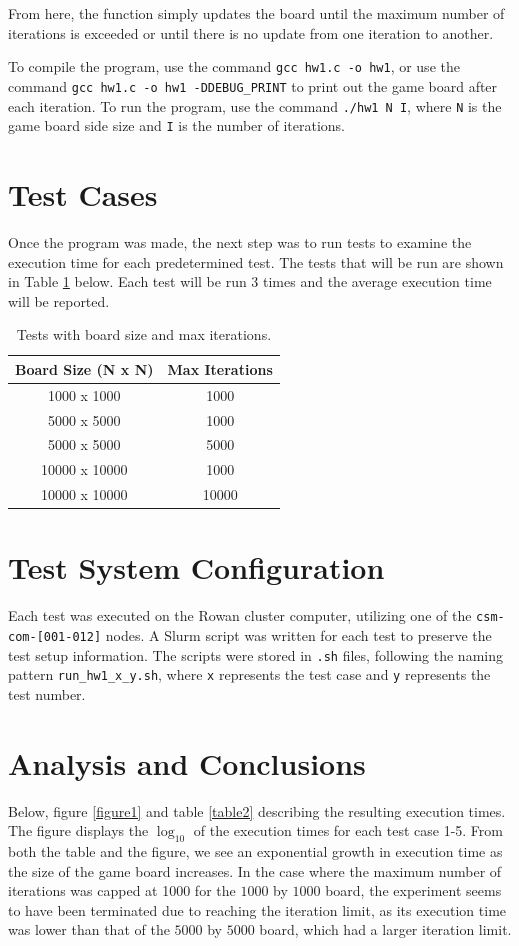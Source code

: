 \documentclass{article}
\begin{document}
	From here, the function simply updates the board until the maximum number of iterations is exceeded or until there is no update from one iteration to another.
	
	To compile the program, use the command \texttt{gcc hw1.c -o hw1}, or use the command \texttt{gcc hw1.c -o hw1 -DDEBUG\_PRINT} to print out the game board after each iteration. To run the program, use the command \texttt{./hw1 N I}, where \texttt{N} is the game board side size and \texttt{I} is the number of iterations.

	\section{Test Cases}
	Once the program was made, the next step was to run tests to examine the execution time for each predetermined test. The tests that will be run are shown in Table \ref{table1} below. Each test will be run 3 times and the average execution time will be reported.

	\begin{table}[ht]
		\centering
		\begin{tabular}{|c|c|}
			\hline
			\textbf{Board Size (N x N)} & \textbf{Max Iterations} \\
			\hline
			1000 x 1000 & 1000 \\
			5000 x 5000 & 1000 \\
			5000 x 5000 & 5000 \\
			10000 x 10000 & 1000 \\
			10000 x 10000 & 10000 \\
			\hline
		\end{tabular}
		\caption{Tests with board size and max iterations.}
		\label{table1}
	\end{table}

	\section{Test System Configuration}
	Each test was executed on the Rowan cluster computer, utilizing one of the \texttt{csm-com-[001-012]} nodes. A Slurm script was written for each test to preserve the test setup information. The scripts were stored in \texttt{.sh} files, following the naming pattern \texttt{run\_hw1\_x\_y.sh}, where \texttt{x} represents the test case and \texttt{y} represents the test number.

	
	\section{Analysis and Conclusions}
	Below, figure \ref{figure1} and table \ref{table2} describing the resulting execution times. The figure displays the \(\log_{10}\) of the execution times for each test case 1-5. From both the table and the figure, we see an exponential growth in execution time as the size of the game board increases. In the case where the maximum number of iterations was capped at 1000 for the \(1000\) by \(1000\) board, the experiment seems to have been terminated due to reaching the iteration limit, as its execution time was lower than that of the \(5000\) by \(5000\) board, which had a larger iteration limit.
	
\end{document}
